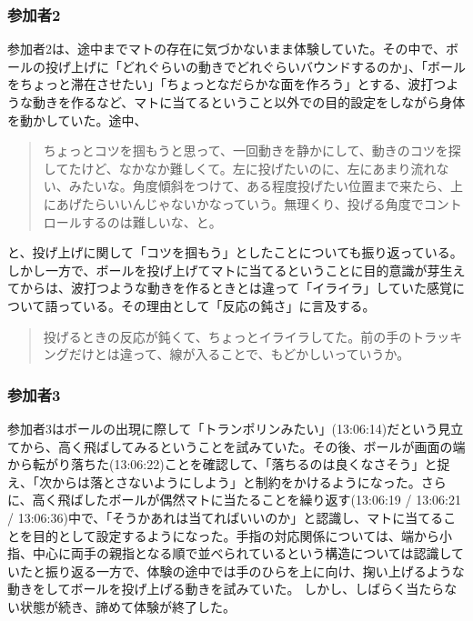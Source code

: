 \subsubsection*{参加者2}
参加者2は、途中までマトの存在に気づかないまま体験していた。その中で、ボールの投げ上げに「どれぐらいの動きでどれぐらいバウンドするのか」、「ボールをちょっと滞在させたい」「ちょっとなだらかな面を作ろう」とする、波打つような動きを作るなど、マトに当てるということ以外での目的設定をしながら身体を動かしていた。途中、
\begin{quote}
  ちょっとコツを掴もうと思って、一回動きを静かにして、動きのコツを探してたけど、なかなか難しくて。左に投げたいのに、左にあまり流れない、みたいな。角度傾斜をつけて、ある程度投げたい位置まで来たら、上にあげたらいいんじゃないかなっていう。無理くり、投げる角度でコントロールするのは難しいな、と。  
\end{quote}
と、投げ上げに関して「コツを掴もう」としたことについても振り返っている。しかし一方で、ボールを投げ上げてマトに当てるということに目的意識が芽生えてからは、波打つような動きを作るときとは違って「イライラ」していた感覚について語っている。その理由として「反応の鈍さ」に言及する。
\begin{quote}
  投げるときの反応が鈍くて、ちょっとイライラしてた。前の手のトラッキングだけとは違って、線が入ることで、もどかしいっていうか。  
\end{quote}
\subsubsection*{参加者3}
参加者3はボールの出現に際して「トランポリンみたい」(13:06:14)だという見立てから、高く飛ばしてみるということを試みていた。その後、ボールが画面の端から転がり落ちた(13:06:22)ことを確認して、「落ちるのは良くなさそう」と捉え、「次からは落とさないようにしよう」と制約をかけるようになった。さらに、高く飛ばしたボールが偶然マトに当たることを繰り返す(13:06:19 / 13:06:21 / 13:06:36)中で、「そうかあれは当てればいいのか」と認識し、マトに当てることを目的として設定するようになった。手指の対応関係については、端から小指、中心に両手の親指となる順で並べられているという構造については認識していたと振り返る一方で、体験の途中では手のひらを上に向け、掬い上げるような動きをしてボールを投げ上げる動きを試みていた。
しかし、しばらく当たらない状態が続き、諦めて体験が終了した。

